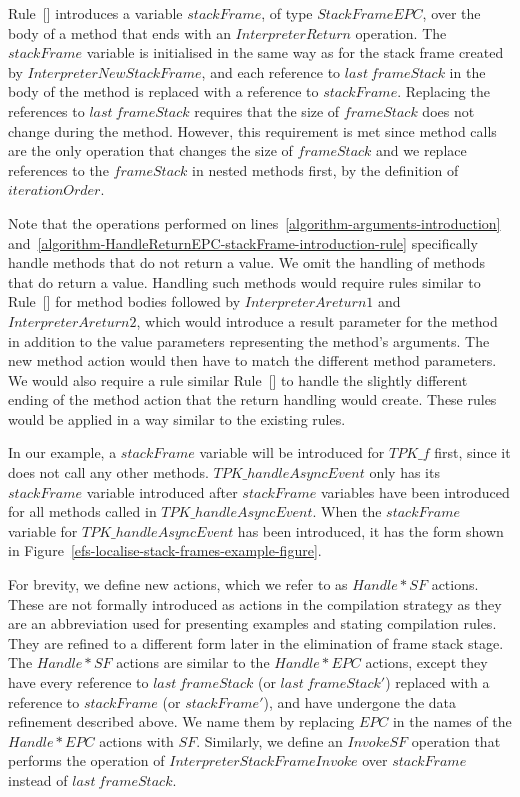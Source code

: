 Rule~[]
introduces a variable $stackFrame$, of type $StackFrameEPC$, over the
body of a method that ends with an $InterpreterReturn$ operation.
The $stackFrame$ variable is initialised in the same way as for the
stack frame created by $InterpreterNewStackFrame$, and each reference
to $last~frameStack$ in the body of the method is replaced with a
reference to $stackFrame$.
Replacing the references to $last~frameStack$ requires that the size
of $frameStack$ does not change during the method.
However, this requirement is met since method calls are the only
operation that changes the size of $frameStack$ and we replace
references to the $frameStack$ in nested methods first, by the
definition of $iterationOrder$.

Note that the operations performed on
lines~\ref{algorithm-arguments-introduction}
and~\ref{algorithm-HandleReturnEPC-stackFrame-introduction-rule}
specifically handle methods that do not return a value.
We omit the handling of methods that do return a value. 
Handling such methods would require rules similar to
Rule~[] for method bodies
followed by $InterpreterAreturn1$ and $InterpreterAreturn2$, which
would introduce a result parameter for the method in addition to the
value parameters representing the method's arguments.
The new method action would then have to match the different method
parameters.
We would also require a rule similar
Rule~[] to
handle the slightly different ending of the method action that the
return handling would create.
These rules would be applied in a way similar to the existing rules.

In our example, a $stackFrame$ variable will be introduced for
$TPK\_f$ first, since it does not call any other methods.
$TPK\_handleAsyncEvent$ only has its $stackFrame$ variable introduced
after $stackFrame$ variables have been introduced for all methods
called in $TPK\_handleAsyncEvent$.
When the $stackFrame$ variable for $TPK\_handleAsyncEvent$ has been
introduced, it has the form shown in
Figure~\ref{efs-localise-stack-frames-example-figure}.

For brevity, we define new actions, which we refer to as $Handle*SF$
actions.
These are not formally introduced as actions in the compilation
strategy as they are an abbreviation used for presenting examples and
stating compilation rules.
They are refined to a different form later in the elimination of frame
stack stage.
The $Handle*SF$ actions are similar to the $Handle*EPC$ actions,
except they have every reference to $last~frameStack$ (or
$last~frameStack'$) replaced with a reference to $stackFrame$ (or
$stackFrame'$), and have undergone the data refinement described
above.
We name them by replacing $EPC$ in the names of the $Handle*EPC$
actions with $SF$.
Similarly, we define an $InvokeSF$ operation that performs the
operation of $InterpreterStackFrameInvoke$ over $stackFrame$ instead
of $last~frameStack$.

